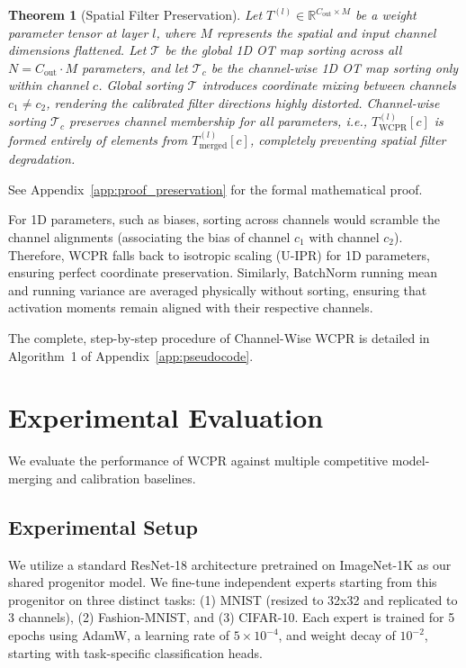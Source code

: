 \documentclass{article}
\theoremstyle{plain}
\newtheorem{theorem}{Theorem}[section]
\theoremstyle{definition}
\theoremstyle{remark}
\begin{document}
\begin{theorem}[Spatial Filter Preservation]
\label{thm:preservation}
  Let $T^{(l)} \in \mathbb{R}^{C_{\text{out}} \times M}$ be a weight parameter tensor at layer $l$, where $M$ represents the spatial and input channel dimensions flattened. Let $\mathcal{T}$ be the global 1D OT map sorting across all $N = C_{\text{out}} \cdot M$ parameters, and let $\mathcal{T}_c$ be the channel-wise 1D OT map sorting only within channel $c$. Global sorting $\mathcal{T}$ introduces coordinate mixing between channels $c_1 \neq c_2$, rendering the calibrated filter directions highly distorted. Channel-wise sorting $\mathcal{T}_c$ preserves channel membership for all parameters, i.e., $T^{(l)}_{\text{WCPR}}[c]$ is formed entirely of elements from $T^{(l)}_{\text{merged}}[c]$, completely preventing spatial filter degradation.
\end{theorem}
See Appendix~\ref{app:proof_preservation} for the formal mathematical proof.

For 1D parameters, such as biases, sorting across channels would scramble the channel alignments (associating the bias of channel $c_1$ with channel $c_2$). Therefore, WCPR falls back to isotropic scaling (U-IPR) for 1D parameters, ensuring perfect coordinate preservation. Similarly, BatchNorm running mean and running variance are averaged physically without sorting, ensuring that activation moments remain aligned with their respective channels.

The complete, step-by-step procedure of Channel-Wise WCPR is detailed in Algorithm~1 of Appendix~\ref{app:pseudocode}.

\section{Experimental Evaluation}
\label{sec:experiments}

We evaluate the performance of WCPR against multiple competitive model-merging and calibration baselines.

\subsection{Experimental Setup}
We utilize a standard ResNet-18 architecture pretrained on ImageNet-1K as our shared progenitor model. We fine-tune independent experts starting from this progenitor on three distinct tasks: (1) MNIST (resized to 32x32 and replicated to 3 channels), (2) Fashion-MNIST, and (3) CIFAR-10. Each expert is trained for 5 epochs using AdamW, a learning rate of $5\times 10^{-4}$, and weight decay of $10^{-2}$, starting with task-specific classification heads. 
\end{document}
